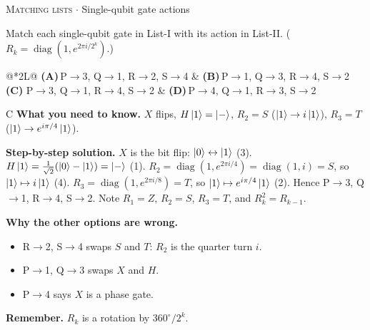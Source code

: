 \documentclass[11pt,a4paper]{article}
\newcommand{\optlabel}[1]{\textbf{(#1)}}
\newcommand{\correctlabel}[1]{\textcolor{okgreen}{\textbf{(#1)}\,\ding{51}}}
\newenvironment{qitem}[1]{\begin{list}{}{\setlength{\leftmargin}{3.3em}\setlength{\labelwidth}{3.1em}%
  \setlength{\labelsep}{0.2em}\setlength{\topsep}{3pt}\setlength{\parsep}{3pt}}\item[\textbf{Q.#1}\hfill]}{\end{list}}
\newcommand{\qsep}{\par\vspace{2pt}{\color{black!15}\hrule}\vspace{4pt}}
\newcommand{\qmeta}[2]{{\footnotesize\color{black!60}\textsc{#1} \;$\cdot$\; #2}\par}
\begin{document}
\begin{qitem}{35}
\qmeta{Matching lists}{Single-qubit gate actions}
Match each single-qubit gate in List-I with its action in List-II. ($R_k = \operatorname{diag}(1, e^{2\pi i/2^k})$.)
\par\smallskip{}
\par\smallskip\noindent\begin{tabularx}{\linewidth}{@{}*{2}{L}@{}}
\optlabel{A}\,P$\to$3, Q$\to$1, R$\to$2, S$\to$4 & \optlabel{B}\,P$\to$1, Q$\to$3, R$\to$4, S$\to$2 \\[3pt]
\correctlabel{C}\,P$\to$3, Q$\to$1, R$\to$4, S$\to$2 & \optlabel{D}\,P$\to$4, Q$\to$1, R$\to$3, S$\to$2
\end{tabularx}
\end{qitem}
\begin{solbox}{C}
\textbf{\color{brand}What you need to know.} $X$ flips, $H\ket1 = \ket-$, $R_2 = S$ ($\ket1\to i\ket1$), $R_3 = T$ ($\ket1\to e^{i\pi/4}\ket1$).

\textbf{\color{brand}Step-by-step solution.} $X$ is the bit flip: $\ket0 \leftrightarrow \ket1$ (3). $H\ket1 = \frac{1}{\sqrt2}(\ket0 - \ket1) = \ket{-}$ (1).
$R_2 = \operatorname{diag}(1, e^{2\pi i/4}) = \operatorname{diag}(1, i) = S$, so $\ket1 \mapsto i\ket1$ (4).
$R_3 = \operatorname{diag}(1, e^{2\pi i/8}) = T$, so $\ket1 \mapsto e^{i\pi/4}\ket1$ (2).
Hence P$\to$3, Q$\to$1, R$\to$4, S$\to$2. Note $R_1 = Z$, $R_2 = S$, $R_3 = T$, and $R_{k}^{2} = R_{k-1}$.

\textbf{\color{brand}Why the other options are wrong.}
\begin{itemize}[leftmargin=2.4em, itemsep=1pt, topsep=2pt]
\item[\textbf{(A)}] R$\to$2, S$\to$4 swaps $S$ and $T$: $R_2$ is the quarter turn $i$.
\item[\textbf{(B)}] P$\to$1, Q$\to$3 swaps $X$ and $H$.
\item[\textbf{(D)}] P$\to$4 says $X$ is a phase gate.
\end{itemize}
\textbf{\color{brand}Remember.} $R_k$ is a rotation by $360^\circ/2^k$.
\end{solbox}
\qsep
\end{document}
